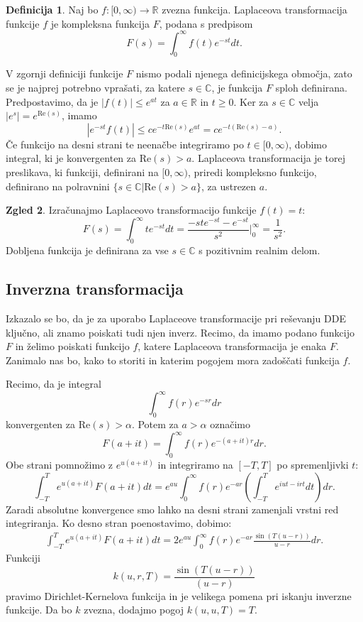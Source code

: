 \documentclass[12pt,a4paper]{amsart}
\theoremstyle{definition} %
\newtheorem{definicija}{Definicija}[section]
\newtheorem{zgled}[definicija]{Zgled}
\theoremstyle{plain} %
\newcommand{\R}{\mathbb R}
\newcommand{\C}{\mathbb C}
\begin{document}
\begin{definicija}
    Naj bo $f:[0,\infty) \to \R$ zvezna funkcija. Laplaceova transformacija funkcije $f$ je kompleksna funkcija
    $F$, podana s predpisom
    \[ F(s)=\int_{0}^{\infty}f(t)e^{-st}dt.\]
\end{definicija}

\noindent V zgornji definiciji funkcije $F$ nismo podali njenega definicijskega območja, zato se je
najprej potrebno vprašati, za katere $s\in\C$, je funkcija $F$ sploh definirana. Predpostavimo, da je
$|f(t)|\leq e^{at}$ za $a\in\R$ in $t\geq0$. Ker za $s\in\C$ velja $|e^{s}|=e^{\text{Re}(s)}$, imamo
\[|e^{-st}f(t)| \leq ce^{-t\text{Re}(s)}e^{at}=ce^{-t(\text{Re}(s)-a)}.\]
Če funkcijo na desni strani te neenačbe integriramo po $t\in [0,\infty)$, dobimo integral, ki je konvergenten za $\text{Re}(s)>a$.
Laplaceova transformacija je torej preslikava, ki funkciji, definirani na $[0,\infty)$, priredi
kompleksno funkcijo, definirano na polravnini $\{s\in\C | \text{Re}(s)>a\}$, za ustrezen $a$.

\begin{zgled}
    Izračunajmo Laplaceovo transformacijo funkcije $f(t)=t$:
    \[F(s)=\int_0^{\infty}te^{-st}dt = \frac{-ste^{-st}-e^{-st}}{s^2}\Bigr|_{0}^{\infty}=\frac{1}{s^2}.\]
    Dobljena funkcija je definirana za vse $s\in\C$ s pozitivnim realnim delom.
\end{zgled}

\subsection{Inverzna transformacija}
Izkazalo se bo, da je za uporabo Laplaceove transformacije pri reševanju DDE ključno, 
ali znamo poiskati tudi njen inverz.
Recimo, da imamo podano funkcijo
$F$ in želimo poiskati funkcijo $f$, katere Laplaceova transformacija je enaka $F$.
Zanimalo nas bo, kako to storiti in katerim pogojem mora zadoščati funkcija $f$.

Recimo, da je integral 
\[\int_0^{\infty}f(r)e^{-sr}dr\]
konvergenten za $\text{Re}(s)>\alpha$. Potem za $a>\alpha$ označimo
\[F(a+it)=\int_0^{\infty}f(r)e^{-(a+it)r}dr.\]
Obe strani pomnožimo z $e^{u(a+it)}$ in integriramo na $[-T,T]$ po spremenljivki $t$:
\[\int_{-T}^{T}e^{u(a+it)}F(a+it)dt=e^{au}\int_0^{\infty}f(r)e^{-ar}\left(\int_{-T}^{T}e^{iut-irt}dt\right)dr.\]
Zaradi absolutne konvergence smo lahko na desni strani zamenjali vrstni red integriranja.
Ko desno stran poenostavimo, dobimo:
\begin{equation} \label{eq2}
    \begin{split}
        \int_{-T}^{T}e^{u(a+it)}F(a+it)dt=2e^{au}\int_0^{\infty}f(r)e^{-ar}\frac{\sin(T(u-r))}{u-r}dr.
    \end{split}
\end{equation}
Funkciji $$k(u,r,T)=\frac{\sin(T(u-r))}{(u-r)}$$ pravimo Dirichlet-Kernelova funkcija in je velikega pomena 
pri iskanju inverzne funkcije. Da bo $k$ zvezna, dodajmo pogoj $k(u,u,T)=T$. %
\end{document}
